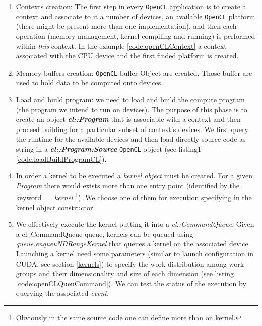     \begin{enumerate}
    	\item Contexts creation: The first step in every \texttt{OpenCL} application is to create a context and associate to it a number of devices, an available \texttt{OpenCL} platform (there might be present more than one implementation), and then each operation (memory management, kernel compiling and running) is performed within \emph{this} context. In the example \ref{code:openCLContext} a context associated with the CPU device and the first finded platform is created.\\

    	\item Memory buffers creation: \texttt{OpenCL} buffer Object are created. Those
    	buffer are used to hold data to be computed onto devices.\\
    	
    	\item Load and build program: we need to load and build the compute program
    	(the program we intend to run on devices). The purpose of this phase is to
    	create an object \textbf{\textit{cl::Program}} that is associable with a
    	context and then proceed building for a particular subset of
    	context's devices. We first query the runtime for the available devices and
    	then load directly source code as string in a
    	\textbf{\textit{cl::Program:Source}} \texttt{OpenCL} object (see listing1
    	\ref{code:loadBuildProgramCL}).\\
    	
    	\item In order a kernel to be executed a \emph{kernel object} must be created.
    	For a given \emph{Program} there would exists more than one entry point
    	(identified by the keyword \emph{\_\_kernel} \footnote{Obviously in the same
    		source code one can define more than on kernel.}). We choose one of them for
    	execution specifying in the kernel object constructor\\
    	
    	\item We effectively execute the kernel putting it into a 
    	\emph{cl::CommandQueue}. Given a cl::CommandQueue queue, kernels can be queued
    	using \textit{queue.enqueu\-NDRangeKernel} that queues a kernel on
    	the associated device.
    	Launching a kernel need some parameters (similar to launch configuration in
    	CUDA, see section \ref{kernels}) to specify the work distribution among
    	work-groups and their dimensionality and size of each dimension (see listing
    	\ref{code:openCLQueuCommand}). We can test the status of the execution by
    	querying the associated \emph{event}.\\
    \end{enumerate}
    
